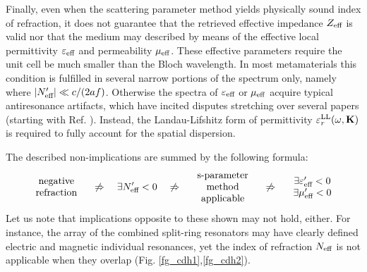 Finally, even when the scattering parameter method yields physically sound index of refraction, it does not guarantee that the retrieved effective impedance $Z_{\text{eff} }$ is valid nor that the medium may described by means of the effective local permittivity $\varepsilon_{\text{eff} }$ and permeability $\mu_{\text{eff} }$. These effective parameters require the unit cell be much smaller than the Bloch wavelength. In most metamaterials this condition is fulfilled in several narrow portions of the spectrum only, namely where $|N_{\text{eff} }'| \ll c/(2af)$. Otherwise the spectra of $\varepsilon_{\text{eff} }$ or $\mu_{\text{eff} }$ acquire typical antiresonance artifacts, which have incited disputes stretching over several papers (starting with Ref. \cite{koschny2003resonant}). Instead, the Landau-Lifshitz form of permittivity $\varepsilon_r^\text{LL}(\omega,{\mathbf{K}})$ is required to fully account for the spatial dispersion. 

The described non-implications are summed by the following formula:
\begin{equation}
\begin{array}{c} \text{negative}\\ \text{refraction} \end{array}
\quad\not\Rightarrow\quad  \exists N_{\text{eff} }' < 0 
\quad\not\Rightarrow\quad \begin{array}{c} \text{s-parameter}\\ \text{method}\\ \text{applicable}  \end{array}
\quad\not\Rightarrow\quad \begin{array}{c} \exists \varepsilon_{\text{eff} }'<0\\ \exists\mu_{\text{eff} }'<0  \end{array} 
\label{eq_implications}\end{equation} %
Let us note that implications opposite to these shown may not hold, either.  For instance, the array of the combined split-ring resonators may have clearly defined electric and magnetic individual resonances, yet the index of refraction $N_{\text{eff} }$ is not applicable when they overlap  (Fig. \ref{fg_cdh1},\ref{fg_cdh2}).


